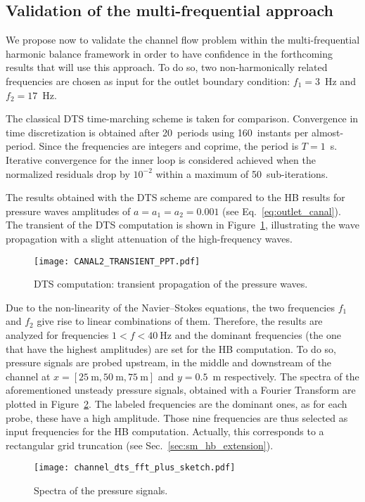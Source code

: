 \subsection{Validation of the multi-frequential approach}
\label{sec:channel_multifreq}

We propose
now to validate the channel flow problem within 
the multi-frequential harmonic balance framework
in order to have confidence in the forthcoming results that
will use this approach.
To do so, two non-harmonically related
frequencies are chosen as input for the outlet boundary condition:
$f_1 = 3$~Hz and $f_2 = 17$~Hz.

The classical DTS time-marching scheme is taken for comparison.
Convergence in time discretization is obtained after 20~periods using
160~instants per almost-period. Since the frequencies are integers and
coprime, the period is $T=1$~s.  Iterative convergence for the
inner loop is considered achieved when the normalized residuals drop
by $10^{-2}$ within a maximum of 50~sub-iterations.

The results obtained with the DTS scheme are compared to the HB
results for pressure waves amplitudes of $a = a_1 = a_2 = 0.001$
(see Eq.~\eqref{eq:outlet_canal}). The
transient of the DTS computation is shown in
Figure~\ref{fig:canal2_transient}, illustrating the wave propagation
with a slight attenuation of the high-frequency waves.
\begin{figure}[htp]
  \centering
  \texttt{[image: CANAL2\_TRANSIENT\_PPT.pdf]}
  \caption{DTS computation: transient propagation of the pressure waves.}
  \label{fig:canal2_transient}
\end{figure}

Due to the non-linearity of the Navier--Stokes equations, the two frequencies
$f_1$ and $f_2$ give rise to linear combinations of them.
Therefore, the results are analyzed for frequencies $1<f< 40~\textrm{Hz}$ and the
dominant frequencies (the one that have the highest amplitudes) are
set for the HB computation.  To do so, pressure signals are probed
upstream, in the middle and downstream of the channel at
$x=[25~\textrm{m}, 50~\textrm{m}, 75~\textrm{m}]$ and $y=0.5$~m
respectively.  The spectra of the aforementioned unsteady pressure
signals, obtained with a Fourier Transform are plotted in
Figure~\ref{fig:canal2_dts_fft}.  The labeled frequencies are the
dominant ones, as for each probe, these have a high amplitude. Those
nine frequencies are thus selected as input frequencies for the HB computation.
Actually, this corresponds to a rectangular grid truncation 
(see Sec.~\ref{sec:sm_hb_extension}).
\begin{figure}[htp]
  \centering
  \texttt{[image: channel\_dts\_fft\_plus\_sketch.pdf]}
  \caption{Spectra of the pressure signals.}
  \label{fig:canal2_dts_fft}
\end{figure}

